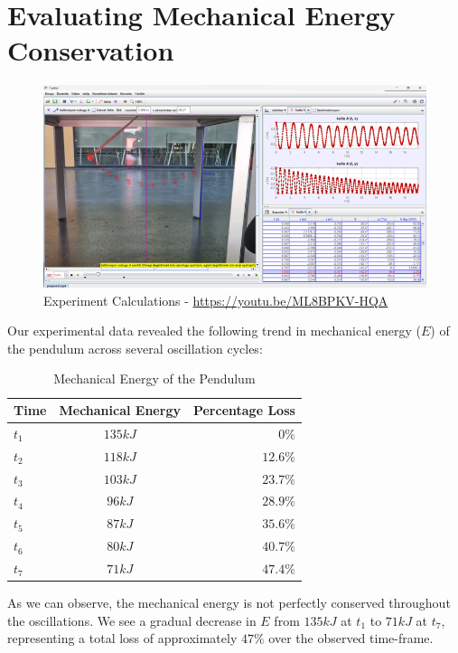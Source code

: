 \section{Evaluating Mechanical Energy Conservation}

\begin{figure}[h]
	\centering
	\includegraphics[width=1\textwidth]{assets/experiment.png}
	\caption{Experiment Calculations - \url{https://youtu.be/ML8BPKV-HQA}}
\end{figure}

Our experimental data revealed the following trend in mechanical energy ($E$) of the pendulum across several oscillation cycles:

\begin{table}[h]
	\centering
	\begin{tabular}{l|c|r}
		\textbf{Time} & \textbf{Mechanical Energy} & \textbf{Percentage Loss} \\
		\hline
		$t_{1}$ & $135kJ$ & $0\%$\\
		$t_{2}$ & $118kJ$ & $12.6\%$\\
		$t_{3}$ & $103kJ$ & $23.7\%$\\
		$t_{4}$ & $96kJ$ & $28.9\%$\\
		$t_{5}$ & $87kJ$ & $35.6\%$\\
		$t_{6}$ & $80kJ$ & $40.7\%$\\
		$t_{7}$ & $71kJ$ & $47.4\%$\\
	\end{tabular}
	\caption{Mechanical Energy of the Pendulum}
\end{table}

\newpage
\thispagestyle{plain}

As we can observe, the mechanical energy is not perfectly conserved throughout the oscillations. We see a gradual decrease in $E$ from $135kJ$ at $t_{1}$ to $71kJ$ at $t_{7}$, representing a total loss of approximately $47\%$ over the observed time-frame.

